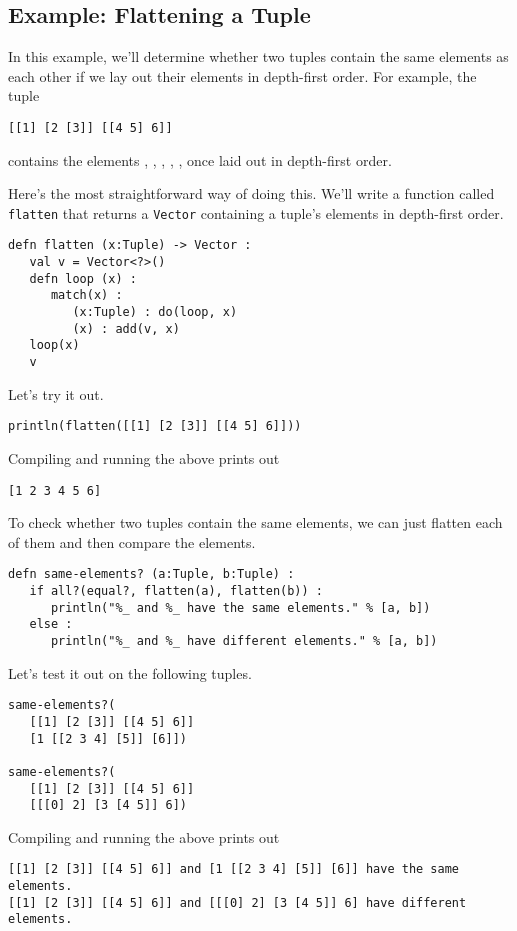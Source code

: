 \documentclass[10pt,oneside]{book}
\begin{document}
\subsection*{Example: Flattening a Tuple}
In this example, we'll determine whether two tuples contain the same elements as each other if we lay out their elements in depth-first order. For example, the tuple
\begin{lstlisting}
[[1] [2 [3]] [[4 5] 6]]
\end{lstlisting}
contains the elements \texttt{}, \texttt{}, \texttt{}, \texttt{}, \texttt{}, \texttt{} once laid out in depth-first order.

Here's the most straightforward way of doing this. We'll write a function called \texttt{\frenchspacing flatten} that returns a \texttt{\frenchspacing Vector} containing a tuple's elements in depth-first order.
\begin{lstlisting}
defn flatten (x:Tuple) -> Vector :
   val v = Vector<?>()
   defn loop (x) :
      match(x) :
         (x:Tuple) : do(loop, x)
         (x) : add(v, x)
   loop(x)         
   v      
\end{lstlisting}
Let's try it out.
\begin{lstlisting}
println(flatten([[1] [2 [3]] [[4 5] 6]]))
\end{lstlisting}
Compiling and running the above prints out
\begin{lstlisting}
[1 2 3 4 5 6]
\end{lstlisting}

To check whether two tuples contain the same elements, we can just flatten each of them and then compare the elements.
\begin{lstlisting}
defn same-elements? (a:Tuple, b:Tuple) :
   if all?(equal?, flatten(a), flatten(b)) :
      println("%_ and %_ have the same elements." % [a, b])
   else :
      println("%_ and %_ have different elements." % [a, b])
\end{lstlisting}

Let's test it out on the following tuples.
\begin{lstlisting}
same-elements?(
   [[1] [2 [3]] [[4 5] 6]]
   [1 [[2 3 4] [5]] [6]])

same-elements?(
   [[1] [2 [3]] [[4 5] 6]]
   [[[0] 2] [3 [4 5]] 6])
\end{lstlisting}
Compiling and running the above prints out
\begin{lstlisting}
[[1] [2 [3]] [[4 5] 6]] and [1 [[2 3 4] [5]] [6]] have the same elements.
[[1] [2 [3]] [[4 5] 6]] and [[[0] 2] [3 [4 5]] 6] have different elements.
\end{lstlisting}
\end{document}
